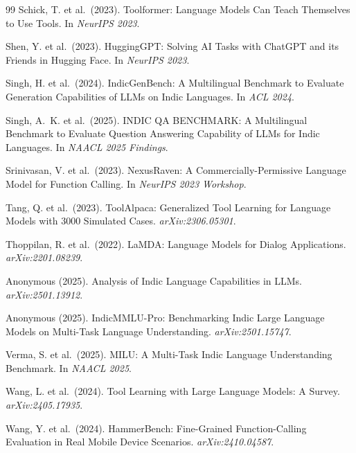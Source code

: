 \documentclass[11pt]{article}
\begin{document}
\begin{thebibliography}{99}
Schick, T. et al.\ (2023).
\newblock Toolformer: Language Models Can Teach Themselves to Use Tools.
\newblock In \textit{NeurIPS 2023}.

Shen, Y. et al.\ (2023).
\newblock HuggingGPT: Solving AI Tasks with ChatGPT and its Friends in Hugging Face.
\newblock In \textit{NeurIPS 2023}.

Singh, H. et al.\ (2024).
\newblock IndicGenBench: A Multilingual Benchmark to Evaluate Generation Capabilities of LLMs on Indic Languages.
\newblock In \textit{ACL 2024}.

Singh, A.~K. et al.\ (2025).
\newblock INDIC QA BENCHMARK: A Multilingual Benchmark to Evaluate Question Answering Capability of LLMs for Indic Languages.
\newblock In \textit{NAACL 2025 Findings}.

Srinivasan, V. et al.\ (2023).
\newblock NexusRaven: A Commercially-Permissive Language Model for Function Calling.
\newblock In \textit{NeurIPS 2023 Workshop}.

Tang, Q. et al.\ (2023).
\newblock ToolAlpaca: Generalized Tool Learning for Language Models with 3000 Simulated Cases.
\newblock \textit{arXiv:2306.05301}.

Thoppilan, R. et al.\ (2022).
\newblock LaMDA: Language Models for Dialog Applications.
\newblock \textit{arXiv:2201.08239}.

Anonymous (2025).
\newblock Analysis of Indic Language Capabilities in LLMs.
\newblock \textit{arXiv:2501.13912}.

Anonymous (2025).
\newblock IndicMMLU-Pro: Benchmarking Indic Large Language Models on Multi-Task Language Understanding.
\newblock \textit{arXiv:2501.15747}.

Verma, S. et al.\ (2025).
\newblock MILU: A Multi-Task Indic Language Understanding Benchmark.
\newblock In \textit{NAACL 2025}.

Wang, L. et al.\ (2024).
\newblock Tool Learning with Large Language Models: A Survey.
\newblock \textit{arXiv:2405.17935}.

Wang, Y. et al.\ (2024).
\newblock HammerBench: Fine-Grained Function-Calling Evaluation in Real Mobile Device Scenarios.
\newblock \textit{arXiv:2410.04587}.


\end{thebibliography}
\end{document}
